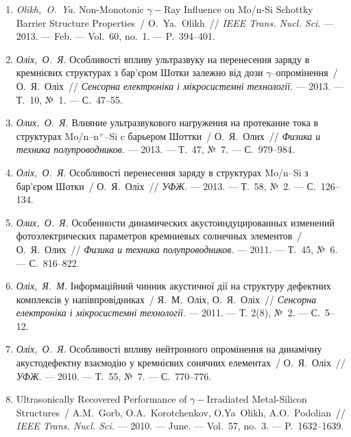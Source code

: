 \begin{enumerate}[label=\arabic*.,leftmargin=1cm,itemindent=0cm]
\item 
\emph{Olikh,~O.~Ya.} Non-Monotonic $\gamma-$Ray Influence on {M}o/n-{S}i
  {S}chottky Barrier Structure Properties~/ O.~Ya.~Olikh~// \emph{IEEE
  Trans. Nucl. Sci.} ---
  2013. --- Feb. ---
  Vol.~60, no.~1. ---
  P.~394--401.

\item 
\emph{Оліх,~О.~Я.} Особливості впливу
  ультразвуку на перенесення заряду в
  кремнієвих структурах з бар’єром {Ш}отки
  залежно від дози $\gamma$--опромінення~/
  О.~Я.~Оліх~// \emph{Сенсорна електроніка і
  мікросистемні технології}. ---
  2013. ---
  Т.~10, {№}~1. ---
  {С.}~47--55.

\item 
\emph{Олих,~О.~Я.} Влияние ультразвукового
  нагружения на протекание тока в
  структурах {M}o/n--n$^+$--{S}i c барьером {Ш}оттки~/
  О.~Я.~Олих~// \emph{Физика и техника
  полупроводников}. ---
  2013. ---
  Т.~47, {№}~7. ---
  {С.}~979--984.

\item 
\emph{Оліх,~О.~Я.} Особливості перенесення
  заряду в структурах {M}o/n--{S}i з бар’єром
  {Ш}отки~/ О.~Я.~Оліх~// \emph{УФЖ}. ---
  2013. ---
  Т.~58, {№}~2. ---
  {С.}~126--134.

\item 
\emph{Олих,~О.~Я.} Особенности динамических
  акустоиндуцированных изменений
  фотоэлектрических параметров кремниевых
  солнечных элементов~/ О.~Я.~Олих~//
  \emph{Физика и техника полупроводников}. ---
  2011. ---
  Т.~45, {№}~6. ---
  {С.}~816--822.

\item 
\emph{Оліх,~Я.~М.} Інформаційний чинник
  акустичної дії на структуру дефектних
  комплексів у напівпровідниках~/ Я.~М.~Оліх,
  О.~Я.~Оліх~// \emph{Сенсорна електроніка і
  мікросистемні технології}. ---
  2011. ---
  Т. 2(8), {№}~2. ---
  {С.}~5--12.

\item 
\emph{Оліх,~О.~Я.} Особливості впливу
  нейтронного опромінення на динамічну
  акустодефектну взаємодію у кремнієвих
  сонячних елементах~/ О.~Я.~Оліх~// \emph{УФЖ}.
  ---
  2010. ---
  Т.~55, {№}~7. ---
  {С.}~770--776.


\item 
Ultrasonically Recovered Performance of $\gamma-$Irradiated Metal-Silicon
  Structures~/ A.M.~Gorb, O.A.~Korotchenkov, O.Ya~Olikh, A.O.~Podolian~//
  \emph{IEEE Trans. Nucl. Sci.} ---
  2010. --- June. ---
  Vol.~57, no.~3. ---
  P.~1632--1639.


\end{enumerate}
